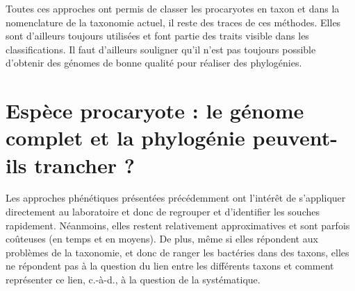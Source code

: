 Toutes ces approches ont permis de classer les procaryotes en taxon et dans la nomenclature de la taxonomie actuel, il reste des traces de ces méthodes. Elles sont d'ailleurs toujours utilisées et font partie des traits visible dans les classifications. Il faut d'ailleurs souligner qu'il n'est pas toujours possible d'obtenir des génomes de bonne qualité pour réaliser des phylogénies.

\section{Espèce procaryote : le génome complet et la phylogénie peuvent-ils trancher ?}

Les approches phénétiques présentées précédemment ont l'intérêt de s'appliquer directement au laboratoire et donc de regrouper et d'identifier les souches rapidement. Néanmoins, elles restent relativement approximatives et sont parfois coûteuses (en temps et en moyens). De plus, même si elles répondent aux problèmes de la taxonomie, et donc de ranger les bactéries dans des taxons, elles ne répondent pas à la question du lien entre les différents taxons et comment représenter ce lien, c.-à-d., à la question de la systématique.

